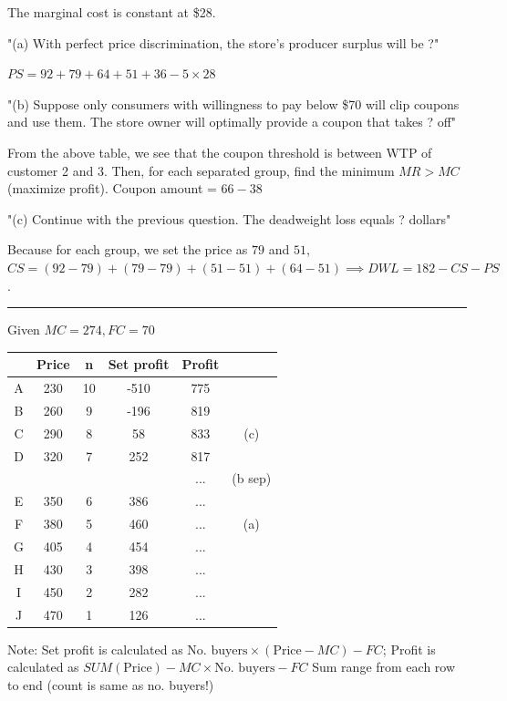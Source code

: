\documentclass[a4paper]{article}
\begin{document}
\begin{multicols*}{3}
    The marginal cost is constant at \$28.

    "(a) With perfect price discrimination, the store’s producer surplus will be ?"

    $PS = 92+79+64+51+36-5\times28$

    "(b) Suppose only consumers with willingness to pay below \$70 will clip coupons and use them. The store owner will optimally provide a coupon that takes ? off"

    From the above table, we see that the coupon threshold is between WTP of customer 2 and 3. Then, for each separated group, find the minimum $MR>MC$ (maximize profit). Coupon amount = $66-38$

    "(c) Continue with the previous question. The deadweight loss equals ? dollars"

    Because for each group, we set the price as $79$ and $51$, $CS = (92-79) + (79-79) + (51-51) + (64-51) \implies DWL = 182 - CS - PS$.

    \rule{1\linewidth}{0.4pt}

    Given $MC=274, FC=70$

    \begin{tabular}{|c|c|c|c|c|c|}
        \hline
          & Price & n  & Set profit & Profit &         \\
        \hline
        A & 230   & 10 & -510       & 775    &         \\
        B & 260   & 9  & -196       & 819    &         \\
        C & 290   & 8  & 58         & 833    & (c)     \\
        D & 320   & 7  & 252        & 817    &         \\
          &       &    &            & ...    & (b sep) \\
        E & 350   & 6  & 386        & ...    &         \\
        F & 380   & 5  & 460        & ...    & (a)     \\
        G & 405   & 4  & 454        & ...    &         \\
        H & 430   & 3  & 398        & ...    &         \\
        I & 450   & 2  & 282        & ...    &         \\
        J & 470   & 1  & 126        & ...    &         \\
        \hline
    \end{tabular}

    Note: Set profit is calculated as $\text{No. buyers}\times(\text{Price} - MC) - FC$; Profit is calculated as $SUM(\text{Price}) - MC \times \text{No. buyers} - FC$ Sum range from each row to end (count is same as no. buyers!)


\end{multicols*}
\end{document}
